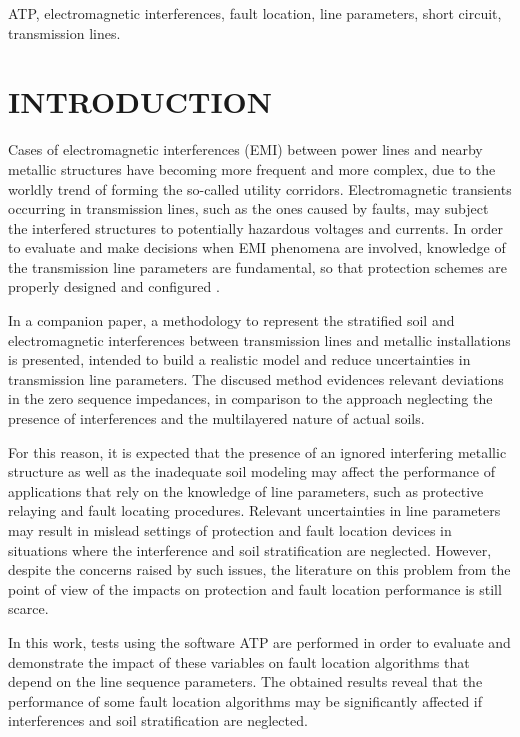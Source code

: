 \documentclass[conference]{IEEEtran}
\begin{document}
	\begin{IEEEkeywords}
		ATP, electromagnetic interferences, fault location, line parameters, short circuit, transmission lines.
	\end{IEEEkeywords}
	
	\section{INTRODUCTION}
	
	Cases of electromagnetic interferences (EMI) between power lines and nearby metallic structures have becoming more frequent and more complex, due to the worldly trend of forming the so-called  utility corridors.  Electromagnetic transients occurring in transmission lines, such as the ones caused by faults, may subject the interfered structures to potentially hazardous voltages and currents. In order to evaluate and make decisions when EMI phenomena are involved, knowledge of the transmission line parameters are fundamental, so that protection schemes are properly designed and configured \cite{CIGREWG36}. 
	
	In a companion paper, a methodology to represent the stratified soil and electromagnetic interferences between transmission lines and metallic installations is presented, intended to build a realistic model and reduce uncertainties in transmission line parameters. The discused method evidences relevant deviations in the zero sequence impedances, in comparison to the approach neglecting the presence of interferences and the multilayered nature of actual soils.    
	
	For this reason, it is expected that the presence of an ignored interfering metallic structure as well as the inadequate soil modeling may affect the performance of applications that rely on the knowledge of line parameters, such as protective relaying and fault locating procedures. Relevant uncertainties in line parameters may result in mislead settings of protection and fault location devices in situations where the interference and soil stratification are neglected. However, despite the concerns raised by such issues, the literature on this problem from the point of view of the impacts on protection and fault location performance is still scarce. 
	
	In this work, tests using the software ATP are performed in order to evaluate and demonstrate the impact of these variables on fault location algorithms that depend on the line sequence parameters. The obtained results reveal that the performance of some fault location algorithms may be significantly affected if interferences and soil stratification are neglected. 
	
\end{document}
